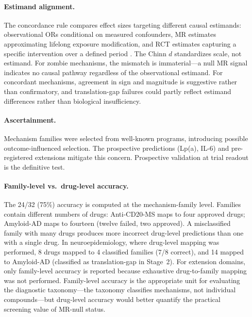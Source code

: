 \documentclass[11pt]{article}
\begin{document}
\paragraph{Estimand alignment.} The concordance rule compares effect sizes targeting different causal estimands: observational ORs conditional on measured confounders, MR estimates approximating lifelong exposure modification, and RCT estimates capturing a specific intervention over a defined period \cite{hernan2016}. The Chinn $d$ standardizes scale, not estimand. For zombie mechanisms, the mismatch is immaterial---a null MR signal indicates no causal pathway regardless of the observational estimand. For concordant mechanisms, agreement in sign and magnitude is suggestive rather than confirmatory, and translation-gap failures could partly reflect estimand differences rather than biological insufficiency.

\paragraph{Ascertainment.} Mechanism families were selected from well-known programs, introducing possible outcome-influenced selection. The prospective predictions (Lp(a), IL-6) and pre-registered extensions mitigate this concern. Prospective validation at trial readout is the definitive test.

\paragraph{Family-level vs.\ drug-level accuracy.} The 24/32 (75\%) accuracy is computed at the mechanism-family level. Families contain different numbers of drugs: Anti-CD20-MS maps to four approved drugs; Amyloid-AD maps to fourteen (twelve failed, two approved). A misclassified family with many drugs produces more incorrect drug-level predictions than one with a single drug. In neuroepidemiology, where drug-level mapping was performed, 8 drugs mapped to 4 classified families (7/8 correct), and 14 mapped to Amyloid-AD (classified as translation-gap in Stage~2). For extension domains, only family-level accuracy is reported because exhaustive drug-to-family mapping was not performed. Family-level accuracy is the appropriate unit for evaluating the diagnostic taxonomy---the taxonomy classifies mechanisms, not individual compounds---but drug-level accuracy would better quantify the practical screening value of MR-null status.
\end{document}
